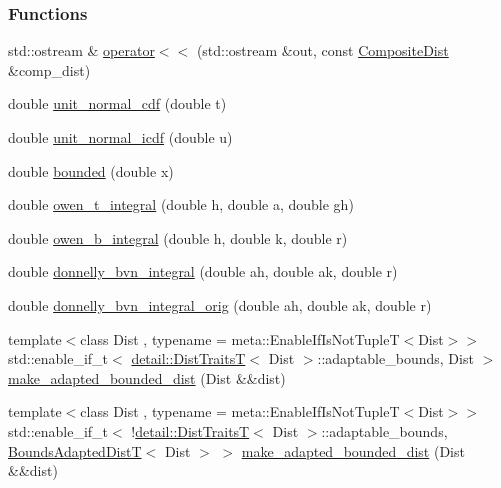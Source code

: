 \subsubsection*{Functions}
\begin{DoxyCompactItemize}
\item 
std\+::ostream \& \hyperlink{namespaceprior__hessian_ab26e9ddc3b6a5caccf5d75e1a1e1af1b}{operator$<$$<$} (std\+::ostream \&out, const \hyperlink{classprior__hessian_1_1CompositeDist}{Composite\+Dist} \&comp\+\_\+dist)
\item 
double \hyperlink{namespaceprior__hessian_ad0373e8965088cd5481ca019aed56a87}{unit\+\_\+normal\+\_\+cdf} (double t)
\item 
double \hyperlink{namespaceprior__hessian_ab76971b5aff40010d5c63fba454349b9}{unit\+\_\+normal\+\_\+icdf} (double u)
\item 
double \hyperlink{namespaceprior__hessian_a860bd0a9eccd25bccf6e1c002022052f}{bounded} (double x)
\item 
double \hyperlink{namespaceprior__hessian_a31c9cb28381da665bdef9a77b4858fc5}{owen\+\_\+t\+\_\+integral} (double h, double a, double gh)
\item 
double \hyperlink{namespaceprior__hessian_a8e1226cb7a7a644fe985a8530b3df07a}{owen\+\_\+b\+\_\+integral} (double h, double k, double r)
\item 
double \hyperlink{namespaceprior__hessian_ae87209106163a600fbde211815f83b5a}{donnelly\+\_\+bvn\+\_\+integral} (double ah, double ak, double r)
\item 
double \hyperlink{namespaceprior__hessian_a4479c56bffd52c8f08515da580030958}{donnelly\+\_\+bvn\+\_\+integral\+\_\+orig} (double ah, double ak, double r)
\item 
{\footnotesize template$<$class Dist , typename  = meta\+::\+Enable\+If\+Is\+Not\+Tuple\+T$<$\+Dist$>$$>$ }\\std\+::enable\+\_\+if\+\_\+t$<$ \hyperlink{namespaceprior__hessian_1_1detail_a00684f44608e5a5bf76458d81159f924}{detail\+::\+Dist\+TraitsT}$<$ Dist $>$\+::adaptable\+\_\+bounds, Dist $>$ \hyperlink{namespaceprior__hessian_a387cc711a6a39924943b5b20ae76bf6a}{make\+\_\+adapted\+\_\+bounded\+\_\+dist} (Dist \&\&dist)
\item 
{\footnotesize template$<$class Dist , typename  = meta\+::\+Enable\+If\+Is\+Not\+Tuple\+T$<$\+Dist$>$$>$ }\\std\+::enable\+\_\+if\+\_\+t$<$ !\hyperlink{namespaceprior__hessian_1_1detail_a00684f44608e5a5bf76458d81159f924}{detail\+::\+Dist\+TraitsT}$<$ Dist $>$\+::adaptable\+\_\+bounds, \hyperlink{namespaceprior__hessian_a919f0d7f51ea845224ca7f03983508a9}{Bounds\+Adapted\+DistT}$<$ Dist $>$ $>$ \hyperlink{namespaceprior__hessian_aac9684eb25c8e9eb2b10640931a08285}{make\+\_\+adapted\+\_\+bounded\+\_\+dist} (Dist \&\&dist)

\end{DoxyCompactItemize}
